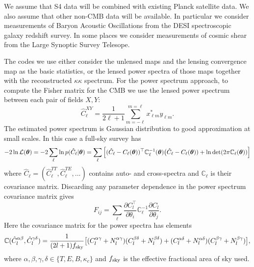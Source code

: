 We assume that S4 data will be combined with existing Planck satellite data. We also assume that other non-CMB data will be available. In particular we consider measurements of Baryon Acoustic Oscillations from the DESI spectroscopic galaxy redshift survey. In some places we consider measurements of cosmic shear from the Large Synoptic Survey Telesope.


The codes we use either consider the unlensed maps and the lensing convergence map as the basic statistics, or the lensed power spectra of those maps together with the reconstructed $\kappa \kappa$ spectrum. For the power spectrum approach, to compute the Fisher matrix for the CMB we use the lensed power spectrum between each pair of fields $X, Y$:
%
\begin{equation}
\label{eqEstimator}
\hat{C}^{XY}_\ell = \frac{1}{2\ell+1}\sum_{m=-\ell}^{m=\ell} x^{*}_{\ell m} y_{\ell m}.
\end{equation}
%
The estimated power spectrum is Gaussian distribution to good approximation at small scales. In this case a full-sky survey has
%
\begin{equation}
-2\ln\mathcal{L}(\boldsymbol{\theta}) = -2\sum_\ell \ln p( \hat{C}_\ell | \boldsymbol{\theta}) \\
=  \sum_\ell  \Big[ (\hat{C}_\ell - C_\ell(\boldsymbol{\theta}) )^\top  \mathbb{C}^{-1}_\ell(\boldsymbol{\theta}) \big(\hat{C}_\ell - C_\ell(\boldsymbol{\theta})) + \ln \det(2 \pi \mathbb{C}_\ell(\boldsymbol{\theta})) \Big]
\end{equation}
%
where $ \hat{C}_\ell = (\hat{C}_\ell^{TT}, \hat{C}_\ell^{TE}, ...) $ contains auto- and cross-spectra and $\mathbb{C}_\ell$ is their covariance matrix. Discarding any parameter dependence in the power spectrum covariance matrix gives
%
\begin{equation}
F_{ij} = \sum_\ell \frac{\partial C^\top_l}{\partial \theta_i} \mathbb{C}^{-1}_\ell \frac{\partial C_l}{\partial \theta_j}.
\end{equation}
%
Here the covariance matrix for the power spectra has elements
%
\begin{equation}
\mathbb{C}(\hat{C}_l^{\alpha \beta}, \hat{C}_l^{\gamma \delta}) = \frac{1}{(2l+1)f_{\rm sky}} \big[ (C_l^{\alpha \gamma} + N_l^{\alpha \gamma}) (C_l^{\beta \delta} + N_l^{\beta \delta})  \\
+ (C_l^{\alpha \delta} + N_l^{\alpha \delta}) (C_l^{\beta \gamma} + N_l^{\beta \gamma}) \big],
\end{equation}
%
where $\alpha, \beta, \gamma, \delta \in \{T, E, B, \kappa_c\}$ and $f_{\rm sky}$ is the effective fractional area of sky used. 

